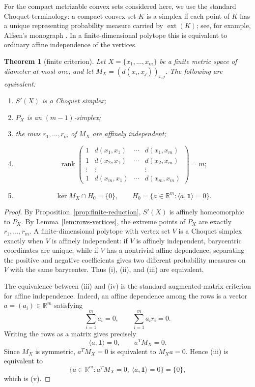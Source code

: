 \documentclass{proc-l}
\numberwithin{equation}{section}
\newtheorem{theorem}{Theorem}[section]
\theoremstyle{definition}
\theoremstyle{remark}
\newcommand{\R}{\mathbb R}
\newcommand{\one}{\mathbf 1}
\newcommand{\ext}{\operatorname{ext}}
\newcommand{\rank}{\operatorname{rank}}
\begin{document}
For the compact metrizable convex sets considered here, we use the standard
Choquet terminology: a compact convex set \(K\) is a simplex if each point of
\(K\) has a unique representing probability measure carried by \(\ext(K)\);
see, for example, Alfsen's monograph \cite{Alfsen1971}.  In a finite-dimensional
polytope this is equivalent to ordinary affine independence of the vertices.

\begin{theorem}[finite criterion]\label{thm:finite-criterion}
Let \(X=\{x_1,\ldots,x_m\}\) be a finite metric space of diameter at most one,
and let \(M_X=(d(x_i,x_j))_{i,j}\).  The following are equivalent:
\begin{enumerate}
\item[\textup{(i)}] \(S'(X)\) is a Choquet simplex;
\item[\textup{(ii)}] \(P_X\) is an \((m-1)\)-simplex;
\item[\textup{(iii)}] the rows \(r_1,\ldots,r_m\) of \(M_X\) are affinely independent;
\item[\textup{(iv)}]
\[
        \rank\begin{pmatrix}
        1&d(x_1,x_1)&\cdots&d(x_1,x_m)\\
        1&d(x_2,x_1)&\cdots&d(x_2,x_m)\\
        \vdots&\vdots&&\vdots\\
        1&d(x_m,x_1)&\cdots&d(x_m,x_m)
        \end{pmatrix}=m;
\]
\item[\textup{(v)}]
\[
        \ker M_X\cap H_0=\{0\},
        \qquad
        H_0=\{a\in\R^m:\langle a,\one\rangle=0\}.
\]
\end{enumerate}
\end{theorem}

\begin{proof}
By Proposition~\ref{prop:finite-reduction}, \(S'(X)\) is affinely homeomorphic to \(P_X\).
By Lemma~\ref{lem:rows-vertices}, the extreme points of \(P_X\) are exactly
\(r_1,\ldots,r_m\).  A finite-dimensional polytope with vertex set \(V\) is a
Choquet simplex exactly when \(V\) is affinely independent: if \(V\) is
affinely independent, barycentric coordinates are unique, while if \(V\) has a
nontrivial affine dependence, separating the positive and negative coefficients
gives two different probability measures on \(V\) with the same barycenter.
Thus \textup{(i)}, \textup{(ii)}, and \textup{(iii)} are equivalent.

The equivalence between \textup{(iii)} and \textup{(iv)} is the standard
augmented-matrix criterion for affine independence.  Indeed, an affine
dependence among the rows is a vector \(a=(a_i)\in\R^m\) satisfying
\[
        \sum_{i=1}^m a_i=0,
        \qquad
        \sum_{i=1}^m a_i r_i=0.
\]
Writing the rows as a matrix gives precisely
\[
        \langle a,\one\rangle=0,
        \qquad
        a^T M_X=0.
\]
Since \(M_X\) is symmetric, \(a^TM_X=0\) is equivalent to \(M_Xa=0\).  Hence
\textup{(iii)} is equivalent to
\[
        \{a\in\R^m:a^TM_X=0,\ \langle a,\one\rangle=0\}=\{0\},
\]
which is \textup{(v)}.
\end{proof}
\end{document}
